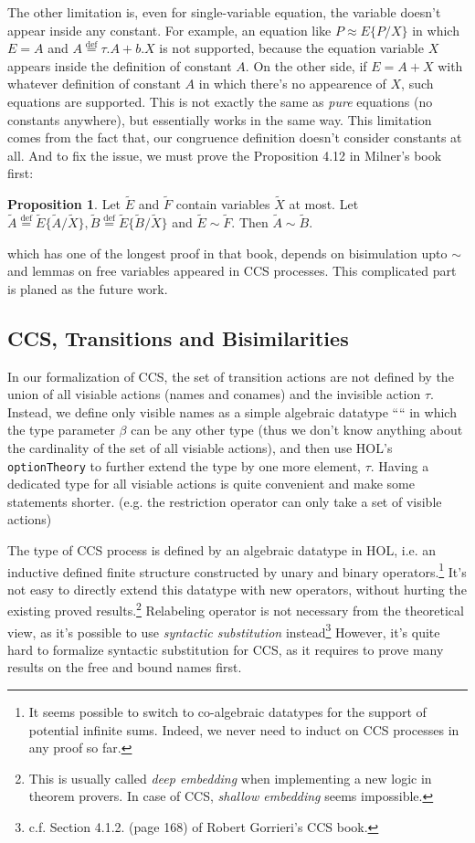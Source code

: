 \documentclass{eptcs} %
\theoremstyle{definition}
\theoremstyle{proposition}
\newtheorem{proposition}{Proposition}[section]
\begin{document}
The other limitation is, even for single-variable equation, the
variable doesn't appear inside any constant.  For example, an equation like
$P \approx E\{P/X\}$ in which $E = A$ and $A \overset{\mathrm{def}}{=}
\tau.A + b.X$ is not supported, because the equation variable $X$
appears inside the definition of constant $A$. On the other side, if
$E = A + X$ with whatever definition of constant $A$ in which there's
no appearence of $X$, such equations are supported. This is not
exactly the same as \emph{pure} equations (no constants anywhere), but
essentially works in the same way. This limitation comes from the fact
that, our congruence definition doesn't consider constants at all.
And to fix the issue, we must prove the Proposition 4.12 in Milner's
book first:
\begin{proposition}
Let $\tilde{E}$ and $\tilde{F}$ contain variables $\tilde{X}$ at
most. Let
$\tilde{A}\overset{\mathrm{def}}{=}\tilde{E}\{\tilde{A}/\tilde{X}\},
\tilde{B}\overset{\mathrm{def}}{=}\tilde{E}\{\tilde{B}/\tilde{X}\}$
and $\tilde{E}\sim\tilde{F}$. Then $\tilde{A}\sim\tilde{B}$.
\end{proposition}
which has one of the longest proof in that book, depends on bisimulation upto
$\sim$ and lemmas on free variables appeared in CCS
processes. This complicated part is planed as the future work.

\subsection{CCS, Transitions and Bisimilarities}

In our formalization of CCS, the set of transition actions are not
defined by the union of all visiable actions (names and conames) and the invisible
action $\tau$. Instead, we define only visible names as a simple
algebraic datatype ```` in which the type parameter
$\beta$ can be any other type (thus we don't know anything about the
cardinality of the set of all visiable actions), and then use HOL's
\texttt{optionTheory} to further extend the type by one more
element, $\tau$. Having a dedicated type for all visiable actions is quite
convenient and make some statements shorter. (e.g. the restriction
operator can only take a set of visible actions)

The type of CCS process is defined by an algebraic datatype in HOL,
i.e. an inductive defined finite structure constructed by unary and
binary operators.\footnote{It seems possible to switch to co-algebraic
datatypes for the support of potential infinite sums. Indeed, we never
need to induct on CCS processes in any proof so far.} 
It's not easy to directly extend this datatype with new operators,
without hurting the existing proved results.\footnote{This is usually
  called \emph{deep embedding} when implementing a new logic in theorem
  provers. In case of CCS, \emph{shallow embedding} seems impossible.}
Relabeling operator is not necessary from the theoretical view, as
it's possible to use \emph{syntactic
  substitution} instead\footnote{c.f. Section 4.1.2. (page 168) of Robert Gorrieri's CCS book.}
However, it's quite hard to formalize syntactic substitution for CCS,
as it requires to prove many results on the free and bound names
first.
\end{document}
